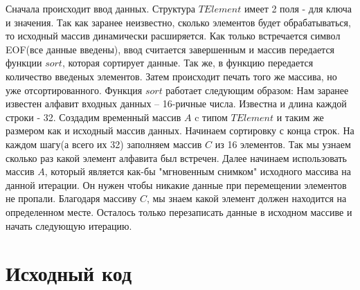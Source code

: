 	Сначала происходит ввод данных. Структура $TElement$ имеет 2 поля - для ключа и значения. Так как заранее неизвестно, сколько элементов будет обрабатываться, то исходный массив динамически расширяется. Как только встречается символ EOF(все данные введены), ввод считается завершенным и массив передается функции $sort$, которая сортирует данные. Так же, в функцию передается количество введеных элементов. Затем происходит печать того же массива, но уже отсортированного.
Функция $sort$ работает следующим образом: Нам заранее известен алфавит входных данных -- 16-ричные числа. Известна и длина каждой строки - 32. Создадим временный массив $A$ c типом $TElement$ и таким же размером как и исходный массив данных. Начинаем сортировку с конца строк. На каждом шагу(а всего их 32) заполняем массив $C$ из 16 элементов. Так мы узнаем сколько раз какой элемент алфавита был встречен.
	Далее начинаем использовать массив $A$, который является как-бы "мгновенным снимком"  исходного массива на данной итерации. Он нужен чтобы никакие данные при перемещении элементов не пропали. Благодаря массиву $C$, мы знаем какой элемент должен находится на определенном месте. Осталось только перезаписать данные в исходном массиве и начать следующую итерацию.
\pagebreak

\section{Исходный код}

